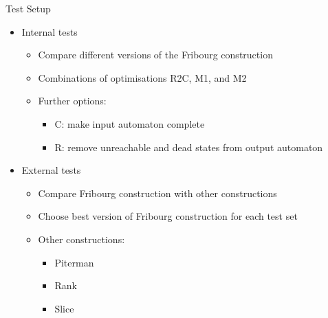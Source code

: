 \documentclass[12pt]{beamer}
\begin{document}
\begin{frame}{Test Setup}
\begin{itemize}\itemsep5pt
\item Internal tests 
  \begin{itemize}\itemsep3pt
  \item Compare different versions of the Fribourg construction
  \item Combinations of optimisations R2C, M1, and M2
  \item Further options:
    \begin{itemize} \itemsep1pt
    \item C: make input automaton complete
    \item R: remove unreachable and dead states from output automaton
    \end{itemize}
  \end{itemize}
\pause
\item External tests
  \begin{itemize}\itemsep3pt
  \item Compare Fribourg construction with other constructions
  \item Choose best version of Fribourg construction for each test set
  \item Other constructions:
    \begin{itemize} \itemsep1pt
    \item Piterman \tabto{1.5cm} \cite{2006_piterman,2007_piterman}
    \item Rank     \tabto{1.5cm} \cite{schewe2009buchi}
    \item Slice    \tabto{1.5cm} \cite{vardi2007automata}
    \end{itemize}
  \end{itemize}
\end{itemize}
\end{frame}
\end{document}
